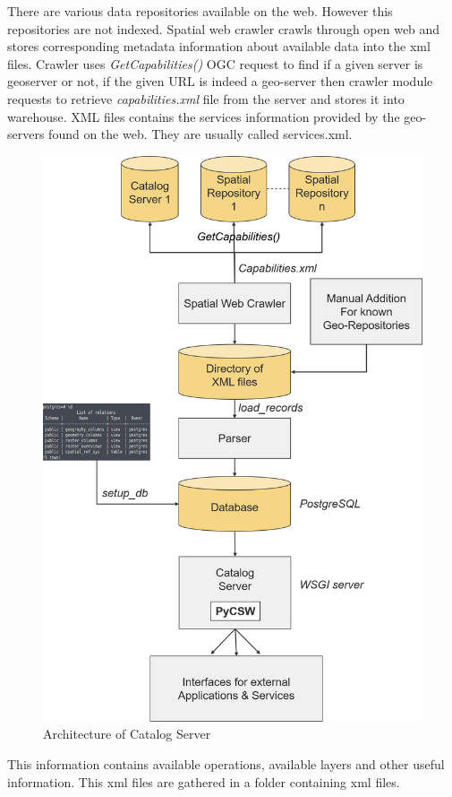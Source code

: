  There are various data repositories available on the web. However this repositories are not indexed. Spatial web crawler crawls through open web and stores corresponding metadata information about available data into the xml files. Crawler uses \textit{GetCapabilities()} OGC request to find if a given server is geoserver or not, if the given URL is indeed a geo-server then crawler module requests to retrieve \textit{capabilities.xml} file from the server and stores it into warehouse. XML files contains the services information provided by the geo-servers found on the web. They are usually called services.xml.
 \begin{figure}[H]
 \includegraphics[width=\textwidth]{pix/Picture3}
 \caption{Architecture of Catalog Server}
 \end{figure}
 This information contains available operations, available layers and other useful information. This xml files are gathered in a folder containing xml files.\\



